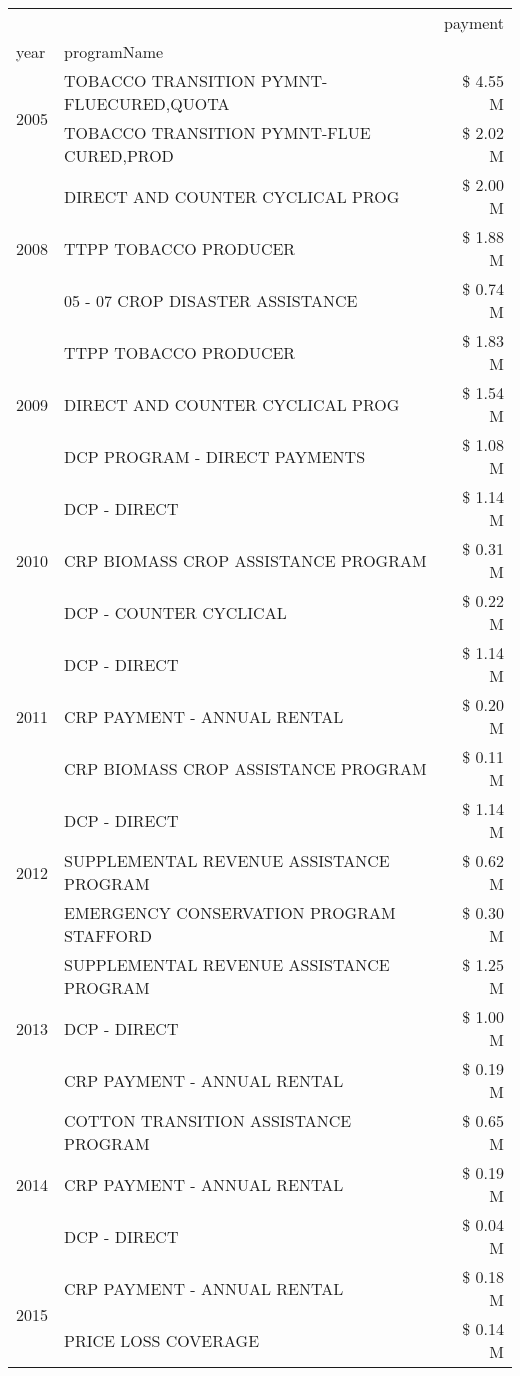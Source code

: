 \begin{tabular}{llr}
\toprule
 &  & payment \\
year & programName &  \\
\midrule
\multirow[t]{2}{*}{2005} & TOBACCO TRANSITION PYMNT-FLUECURED,QUOTA & \$ 4.55 M \\
 & TOBACCO TRANSITION PYMNT-FLUE CURED,PROD & \$ 2.02 M \\
\cline{1-3}
\multirow[t]{3}{*}{2008} & DIRECT AND COUNTER CYCLICAL PROG & \$ 2.00 M \\
 & TTPP TOBACCO PRODUCER & \$ 1.88 M \\
 & 05 - 07 CROP DISASTER ASSISTANCE & \$ 0.74 M \\
\cline{1-3}
\multirow[t]{3}{*}{2009} & TTPP TOBACCO PRODUCER & \$ 1.83 M \\
 & DIRECT AND COUNTER CYCLICAL PROG & \$ 1.54 M \\
 & DCP PROGRAM - DIRECT PAYMENTS & \$ 1.08 M \\
\cline{1-3}
\multirow[t]{3}{*}{2010} & DCP - DIRECT & \$ 1.14 M \\
 & CRP BIOMASS CROP ASSISTANCE PROGRAM & \$ 0.31 M \\
 & DCP - COUNTER CYCLICAL & \$ 0.22 M \\
\cline{1-3}
\multirow[t]{3}{*}{2011} & DCP - DIRECT & \$ 1.14 M \\
 & CRP PAYMENT - ANNUAL RENTAL & \$ 0.20 M \\
 & CRP BIOMASS CROP ASSISTANCE PROGRAM & \$ 0.11 M \\
\cline{1-3}
\multirow[t]{3}{*}{2012} & DCP - DIRECT & \$ 1.14 M \\
 & SUPPLEMENTAL REVENUE ASSISTANCE PROGRAM & \$ 0.62 M \\
 & EMERGENCY CONSERVATION PROGRAM STAFFORD & \$ 0.30 M \\
\cline{1-3}
\multirow[t]{3}{*}{2013} & SUPPLEMENTAL REVENUE ASSISTANCE PROGRAM & \$ 1.25 M \\
 & DCP - DIRECT & \$ 1.00 M \\
 & CRP PAYMENT - ANNUAL RENTAL & \$ 0.19 M \\
\cline{1-3}
\multirow[t]{3}{*}{2014} & COTTON TRANSITION ASSISTANCE PROGRAM & \$ 0.65 M \\
 & CRP PAYMENT - ANNUAL RENTAL & \$ 0.19 M \\
 & DCP - DIRECT & \$ 0.04 M \\
\cline{1-3}
\multirow[t]{3}{*}{2015} & CRP PAYMENT - ANNUAL RENTAL & \$ 0.18 M \\
 & PRICE LOSS COVERAGE & \$ 0.14 M \\

\end{tabular}
